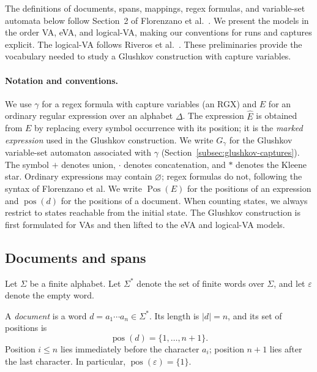 
The definitions of documents, spans, mappings, regex formulas, and
variable-set automata below follow Section~2 of Florenzano et
al.~\cite{FlorenzanoRUVV20}.
We present the models in the order VA, eVA, and logical-VA, making our
conventions for runs and captures explicit. The logical-VA follows
Riveros et al.~\cite{RiverosJV23}. These preliminaries provide the
vocabulary needed to study a Glushkov construction with capture
variables.

\paragraph{Notation and conventions.}
We use $\gamma$ for a regex formula with capture variables (an RGX) and
$E$ for an ordinary regular expression over an alphabet $\Delta$. The
expression $\widehat{E}$ is obtained from $E$ by replacing every symbol
occurrence with its position; it is the \emph{marked expression} used in
the Glushkov construction. We write $G_\gamma$ for the Glushkov
variable-set automaton associated with $\gamma$
(Section~\ref{subsec:glushkov-captures}). The symbol $+$ denotes union,
$\cdot$ denotes concatenation, and $*$ denotes the Kleene star. Ordinary
expressions may contain $\varnothing$; regex formulas do not, following
the syntax of Florenzano et al. We write $\operatorname{Pos}(E)$ for the
positions of an expression and $\operatorname{pos}(d)$ for the positions
of a document. When counting states, we always restrict to states
reachable from the initial state. The Glushkov construction is first
formulated for VAs and then lifted to the eVA and logical-VA models.

\subsection{Documents and spans}\label{subsec:documents-spans}

Let $\Sigma$ be a finite alphabet. Let $\Sigma^*$ denote the set of finite
words over $\Sigma$, and let $\varepsilon$ denote the empty word.

\begin{definition}\label{def:document}
A \emph{document} is a word $d=a_1\cdots a_n\in\Sigma^*$.
Its length is $|d|=n$, and its set of positions is
\[
  \operatorname{pos}(d)=\{1,\ldots,n+1\}.
\]
Position $i\leq n$ lies immediately before the character $a_i$;
position $n+1$ lies after the last character. In particular,
$\operatorname{pos}(\varepsilon)=\{1\}$.
\end{definition}

